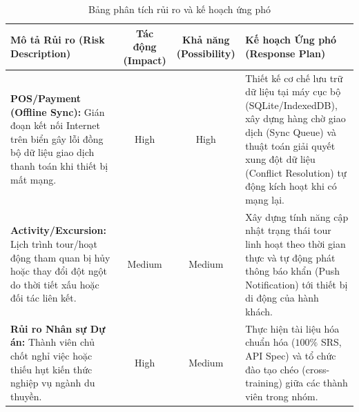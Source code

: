 \documentclass[12pt,a4paper]{article}
\begin{document}
	\begin{table}[h!]
		\centering
		\caption{Bảng phân tích rủi ro và kế hoạch ứng phó}
		\vspace{0.3cm}
		\small
		\begin{tabularx}{\textwidth}{>{\raggedright\arraybackslash}p{3.5cm} c c >{\raggedright\arraybackslash}X}
			\toprule
			\textbf{Mô tả Rủi ro (Risk Description)} & \textbf{Tác động (Impact)} & \textbf{Khả năng (Possibility)} & \textbf{Kế hoạch Ứng phó (Response Plan)} \\
			\midrule
			\textbf{POS/Payment (Offline Sync):} Gián đoạn kết nối Internet trên biển gây lỗi đồng bộ dữ liệu giao dịch thanh toán khi thiết bị mất mạng. & High & High & Thiết kế cơ chế lưu trữ dữ liệu tại máy cục bộ (SQLite/IndexedDB), xây dựng hàng chờ giao dịch (Sync Queue) và thuật toán giải quyết xung đột dữ liệu (Conflict Resolution) tự động kích hoạt khi có mạng lại. \\
			\midrule
			\textbf{Activity/Excursion:} Lịch trình tour/hoạt động tham quan bị hủy hoặc thay đổi đột ngột do thời tiết xấu hoặc đối tác liên kết. & Medium & Medium & Xây dựng tính năng cập nhật trạng thái tour linh hoạt theo thời gian thực và tự động phát thông báo khẩn (Push Notification) tới thiết bị di động của hành khách. \\
			\midrule
			\textbf{Rủi ro Nhân sự Dự án:} Thành viên chủ chốt nghỉ việc hoặc thiếu hụt kiến thức nghiệp vụ ngành du thuyền. & High & Medium & Thực hiện tài liệu hóa chuẩn hóa ($100\%$ SRS, API Spec) và tổ chức đào tạo chéo (cross-training) giữa các thành viên trong nhóm. \\
			\bottomrule
		\end{tabularx}
	\end{table}
	
\end{document}
